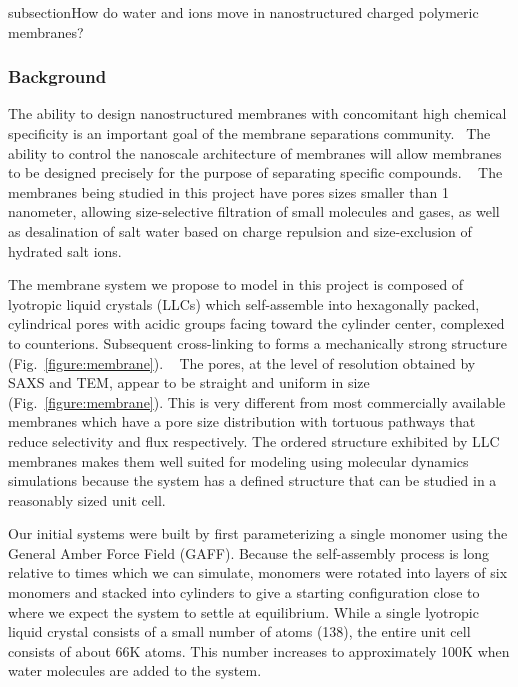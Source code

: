 subsection{How do water and ions move in nanostructured charged polymeric membranes?}
\subsubsection*{Background} 

The ability to design nanostructured membranes with concomitant high chemical
specificity is an important goal of the membrane separations
community.~\cite{Humplik2011} The ability to control
the nanoscale architecture of membranes will allow membranes to be 
designed precisely for the purpose of separating specific compounds.
~\cite{SmithRC1997,Zhu2006} The membranes being studied in this project
have pores sizes smaller than 1 nanometer, allowing size-selective 
filtration of small molecules and gases, as well as desalination of salt
water based on charge repulsion and size-exclusion of hydrated salt ions.


The membrane system we propose to model in this project is composed of
lyotropic liquid crystals (LLCs) which self-assemble into hexagonally
packed, cylindrical pores with acidic groups facing toward the cylinder
center, complexed to counterions. Subsequent cross-linking to forms
a mechanically strong structure (Fig.~\ref{figure:membrane}).
~\cite{Zhou2003,Feng2014,Feng2016} The pores, at the level of resolution
obtained by SAXS and TEM, appear to be straight and uniform in size 
(Fig.~\ref{figure:membrane}).  This is very different from most 
commercially available membranes which have a pore size distribution
with tortuous pathways that reduce selectivity and flux respectively.
The ordered structure exhibited by LLC membranes makes them well suited 
for modeling using molecular dynamics simulations because the
system has a defined structure that can be studied in a reasonably sized 
unit cell.

Our initial systems were built by first parameterizing a single
monomer using the General Amber Force Field (GAFF). Because the
self-assembly process is long relative to times which we can simulate,
monomers were rotated into layers of six monomers and stacked into
cylinders to give a starting configuration close to where we expect
the system to settle at equilibrium. While a single lyotropic liquid
crystal consists of a small number of atoms (138), the entire unit
cell consists of about 66K atoms. This number increases to 
approximately 100K when water molecules are added to the system.


